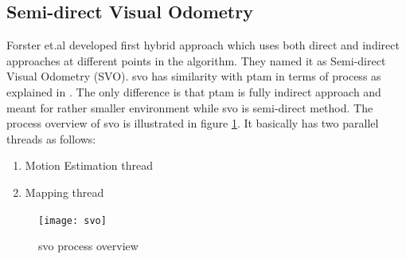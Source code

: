 \subsection{Semi-direct Visual Odometry}
Forster et.al developed first hybrid approach which uses both direct and indirect approaches at different points in the algorithm. They named it as Semi-direct Visual Odometry (SVO). \acrshort{svo} has similarity with \acrshort{ptam} in terms of process as explained in \cite{4538852}. The only difference is that \acrshort{ptam} is fully indirect approach and meant for rather smaller environment while \acrshort{svo} is semi-direct method. The process overview of \acrshort{svo} is illustrated in figure \ref{fig:svo}. It basically has two parallel threads as follows: 
\begin{enumerate}
	\item Motion Estimation thread
	\item Mapping thread
\end{enumerate}
\begin{figure}[H]
	\centering
	\texttt{[image: svo]}
	\caption{\acrshort{svo} process overview \cite{Forster2014ICRA}}
	\label{fig:svo}
\end{figure}

